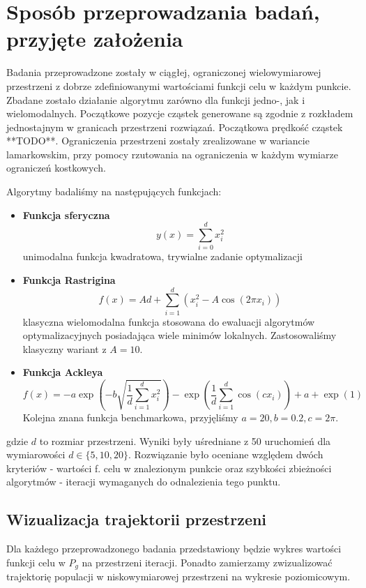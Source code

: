 \documentclass[12pt]{article}
\begin{document}
\section{Sposób przeprowadzania badań, przyjęte założenia}

Badania przeprowadzone zostały w ciągłej, ograniczonej wielowymiarowej przestrzeni z dobrze zdefiniowanymi wartościami funkcji celu w każdym punkcie.
Zbadane zostało działanie algorytmu zarówno dla funkcji jedno-, jak i wielomodalnych. Początkowe pozycje cząstek generowane są zgodnie z rozkładem
jednostajnym w granicach przestrzeni rozwiązań. Początkowa prędkość cząstek **TODO**. Ograniczenia przestrzeni zostały zrealizowane w wariancie lamarkowskim,
przy pomocy rzutowania na ograniczenia w każdym wymiarze ograniczeń kostkowych.


Algorytmy badaliśmy na następujących funkcjach:

\begin{itemize}
	\item \textbf{Funkcja sferyczna}  \[y(x) = \sum_{i = 0}^{d} x_i^2 \] unimodalna funkcja kwadratowa, trywialne
	      zadanie optymalizacji

	\item \textbf{Funkcja Rastrigina} \[f(x) = A d + \sum_{i=1}^{d} \left( x_i^2 - A \cos(2\pi x_i) \right)\]
	      klasyczna wielomodalna
	      funkcja stosowana do ewaluacji algorytmów optymalizacyjnych posiadająca wiele minimów lokalnych.
	      Zastosowaliśmy klasyczny wariant z \(A = 10\).

	\item \textbf{Funkcja Ackleya} \[f(x) = -a \exp \left( -b \sqrt{\frac{1}{d} \sum_{i=1}^{d} x_i^2} \right)
		      - \exp \left( \frac{1}{d} \sum_{i=1}^{d} \cos(c x_i) \right) + a + \exp(1)\]
	      Kolejna znana funkcja benchmarkowa, przyjęliśmy \(a = 20, b = 0.2, c = 2\pi\).
\end{itemize}

gdzie \(d\) to rozmiar przestrzeni. Wyniki były uśredniane z 50 uruchomień dla wymiarowości \(d \in \{5, 10, 20\}\).
Rozwiązanie było oceniane względem dwóch kryteriów - wartości f. celu w znalezionym punkcie oraz szybkości
zbieżności algorytmów - iteracji wymaganych do odnalezienia tego punktu.


\subsection*{Wizualizacja trajektorii przestrzeni}
Dla każdego przeprowadzonego badania przedstawiony będzie wykres wartości funkcji celu w \(P_g\) na przestrzeni iteracji.
Ponadto zamierzamy zwizualizować trajektorię populacji w niskowymiarowej przestrzeni na wykresie poziomicowym.
\end{document}
